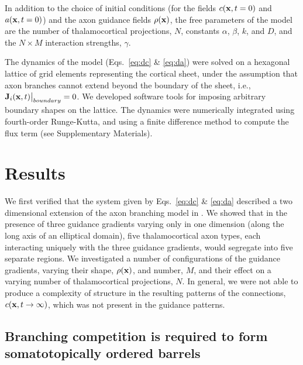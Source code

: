 \documentclass[9pt,twocolumn,twoside,lineno]{pnas-new}
\begin{document}
In addition to the choice of initial conditions (for the fields
$c(\mathbf{x},t=0)$ and $a(\mathbf{x},t=0)$) and the axon guidance fields
$\rho(\mathbf{x})$, the free parameters of the model are the number of
thalamocortical projections, $N$, constants $\alpha$, $\beta$, $k$, and $D$,
and the $N\times M$ interaction strengths, $\gamma$.

The dynamics of the model (Eqs.~\ref{eq:dc} \& \ref{eq:da}) were solved on a
hexagonal lattice of grid elements representing the cortical sheet, under the
assumption that axon branches cannot extend beyond the boundary of the sheet,
i.e., $\mathbf{J}_i(\mathbf{x},t) \big\rvert_{boundary} = 0$. We developed software
tools for imposing arbitrary boundary shapes on the lattice. The dynamics were
numerically integrated using fourth-order Runge-Kutta, and using a
{\color{red} finite difference method} to compute the flux term (see
Supplementary Materials).

\section*{Results}


We first verified that the system given by Eqs.~\ref{eq:dc} \& \ref{eq:da}
described a two dimensional extension of the axon branching model in
\cite{karbowski_model_2004}. We showed that in the presence of three guidance
gradients varying only in one dimension (along the long axis of an elliptical
domain), five thalamocortical axon types, each interacting uniquely with the
three guidance gradients, would segregate into five separate regions. We
investigated a number of configurations of the guidance gradients, varying
their shape, $\rho(\mathbf{x})$, and number, $M$, and their effect on a varying
number of thalamocortical projections, $N$. In general, we were not able to
produce a complexity of structure in the resulting patterns of the
connections, $c(\mathbf{x},t\rightarrow\infty)$, which was not present in the
guidance patterns.


\subsection*{Branching competition is required to form somatotopically ordered barrels}
\end{document}
